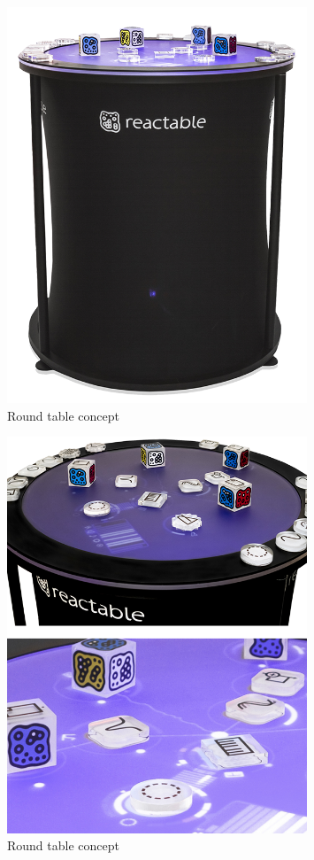 \begin{figure}[H]
	\centering
   	\includegraphics[width=0.8\textwidth]{images/ReacTable-live-6-instrument}
    \caption{Round table concept}
\end{figure}

\begin{figure}[H]
	\centering
   	\includegraphics[width=0.8\textwidth]{images/ReacTable-instrument-detail1}
    \caption{Round table concept \cite{concept2}}
\end{figure}
